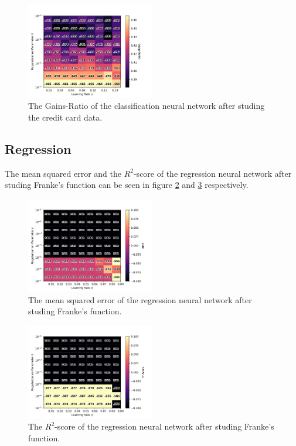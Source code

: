 		\begin{figure}[H]
			\centering
			\includegraphics[width=0.5\textwidth]{figures/cc_res_3.pdf}
			\caption{The Gains-Ratio of the classification neural network after studing the credit card data.}
			\label{fig:cc_gr}
		\end{figure}
	
        
        
    \subsection{Regression}
    
    	The mean squared error and the $R^2$-score of the regression neural network after studing Franke's function can be seen in figure \ref{fig:ff_mse} and \ref{fig:ff_r2} respectively.
    
    	\begin{figure}[H]
    		\centering
    		\includegraphics[width=0.5\textwidth]{figures/ff_res_0.pdf}
    		\caption{The mean squared error of the regression neural network after studing Franke's function.}
    		\label{fig:ff_mse}
    	\end{figure}
    	\begin{figure}[H]
    		\centering
    		\includegraphics[width=0.5\textwidth]{figures/ff_res_1.pdf}
    		\caption{The $R^2$-score of the regression neural network after studing Franke's function.}
    		\label{fig:ff_r2}
    	\end{figure}
    
